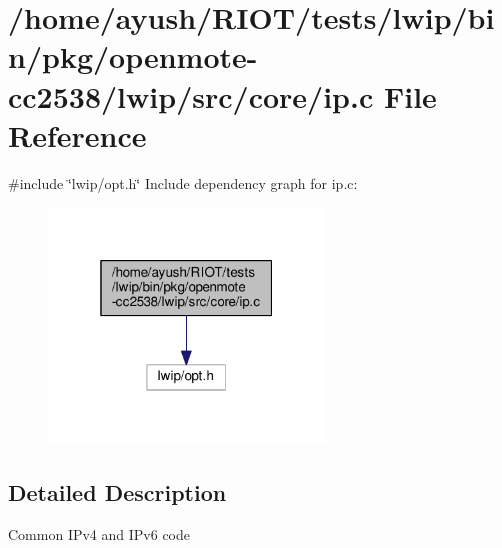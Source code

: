 \hypertarget{bin_2pkg_2openmote-cc2538_2lwip_2src_2core_2ip_8c}{}\section{/home/ayush/\+R\+I\+O\+T/tests/lwip/bin/pkg/openmote-\/cc2538/lwip/src/core/ip.c File Reference}
\label{bin_2pkg_2openmote-cc2538_2lwip_2src_2core_2ip_8c}
{\ttfamily \#include \char`\"{}lwip/opt.\+h\char`\"{}}\newline
Include dependency graph for ip.\+c\+:
\nopagebreak
\begin{figure}[H]
\begin{center}
\leavevmode
\includegraphics[width=208pt]{bin_2pkg_2openmote-cc2538_2lwip_2src_2core_2ip_8c__incl}
\end{center}
\end{figure}


\subsection{Detailed Description}
Common I\+Pv4 and I\+Pv6 code 